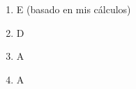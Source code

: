 \documentclass[12pt, a4paper]{article}
\newcommand{\respitem}[1]{\item[\textbf{#1.}]} %
\begin{document}
\begin{enumerate}
    \respitem{18} E (basado en mis cálculos)
    \respitem{19} D %
    \respitem{20} A %
    \respitem{21} A %

\end{enumerate}
\end{document}
